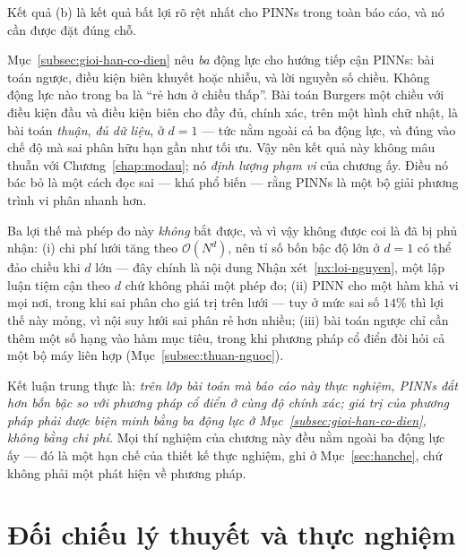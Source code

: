 \begin{nhanxet}
\label{nx:doc-tn9}
Kết quả (b) là kết quả bất lợi rõ rệt nhất cho PINNs trong toàn báo cáo, và nó
cần được đặt đúng chỗ.

Mục~\ref{subsec:gioi-han-co-dien} nêu \emph{ba} động lực cho hướng tiếp cận PINNs: bài
toán ngược, điều kiện biên khuyết hoặc nhiễu, và lời nguyền số chiều. Không động
lực nào trong ba là ``rẻ hơn ở chiều thấp''. Bài toán Burgers một chiều với điều
kiện đầu và điều kiện biên cho đầy đủ, chính xác, trên một hình chữ nhật, là bài
toán \emph{thuận}, \emph{đủ dữ liệu}, ở $d = 1$ --- tức nằm ngoài cả ba động
lực, và đúng vào chế độ mà sai phân hữu hạn gần như tối ưu. Vậy nên kết quả này
không mâu thuẫn với Chương~\ref{chap:modau}; nó \emph{định lượng phạm vi} của
chương ấy. Điều nó bác bỏ là một cách đọc sai --- khá phổ biến --- rằng PINNs là
một bộ giải phương trình vi phân nhanh hơn.

Ba lợi thế mà phép đo này \emph{không} bắt được, và vì vậy không được coi là đã
bị phủ nhận: (i) chi phí lưới tăng theo $\mathcal{O}(N^d)$, nên tỉ số bốn bậc
độ lớn ở $d=1$ có thể đảo chiều khi $d$ lớn --- đây chính là nội dung
Nhận xét~\ref{nx:loi-nguyen}, một lập luận tiệm cận theo $d$ chứ không phải một
phép đo; (ii) PINN cho một hàm khả vi mọi nơi, trong khi sai phân cho giá trị
trên lưới --- tuy ở mức sai số $14\%$ thì lợi thế này mỏng, vì nội suy lưới sai
phân rẻ hơn nhiều; (iii) bài toán ngược chỉ cần thêm một số hạng vào hàm mục
tiêu, trong khi phương pháp cổ điển đòi hỏi cả một bộ máy liên hợp
(Mục~\ref{subsec:thuan-nguoc}).

Kết luận trung thực là: \emph{trên lớp bài toán mà báo cáo này thực nghiệm,
PINNs đắt hơn bốn bậc so với phương pháp cổ điển ở cùng độ chính xác; giá trị
của phương pháp phải được biện minh bằng ba động lực ở
Mục~\ref{subsec:gioi-han-co-dien}, không bằng chi phí.} Mọi thí nghiệm của chương này
đều nằm ngoài ba động lực ấy --- đó là một hạn chế của thiết kế thực nghiệm, ghi
ở Mục~\ref{sec:hanche}, chứ không phải một phát hiện về phương pháp.
\end{nhanxet}

\section{Đối chiếu lý thuyết và thực nghiệm}
\label{sec:doi-chieu}
 
